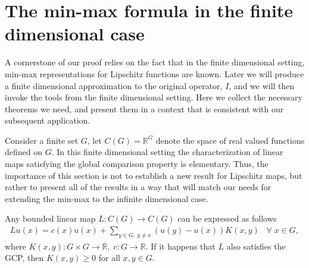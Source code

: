 \documentclass[11pt,reqno]{amsart}
\numberwithin{equation}{section}
\theoremstyle{plain}
\begin{document}
\section{The min-max formula in the finite dimensional case}\label{sec: Min-Max finite dimension}
\setcounter{equation}{0}

A cornerstone of our proof relies on the fact that in the finite dimensional setting, min-max representations for Lipschitz functions are known.  Later we will produce a finite dimensional approximation to the original operator, $I$, and we will then invoke the tools from the finite dimensional setting.  Here we collect the necessary theorems we need, and present them in a context that is consistent with our subsequent application.

Consider a finite set $G$, let $C(G) = \mathbb{R}^G$ denote the space of real valued functions defined on $G$. In this finite dimensional setting the characterization of linear maps satisfying the global comparison property is elementary.  Thus, the importance of this section is not to establish a new result for Lipschitz maps, but rather to present all of the results in a way that will match our needs for extending the min-max to the infinite dimensional case.

\begin{lem}\label{lem: Finite Dimensional Courrege} 
  Any bounded linear map $L:C(G)\to C(G)$ can be expressed as follows
  \begin{align*}
	  Lu(x) = c(x)u(x)+\sum \limits_{y\in G,\ y\not=x} (u(y)-u(x))K(x,y)\;\;\;\forall\;x\in G,
  \end{align*}	  
  where $K(x,y):G \times G\to \mathbb{R},\;c:G\to \mathbb{R}$.  If it happens that $L$ also satisfies the GCP, then $K(x,y)\geq 0$ for all $x,y \in G$.
\end{lem}
\end{document}
